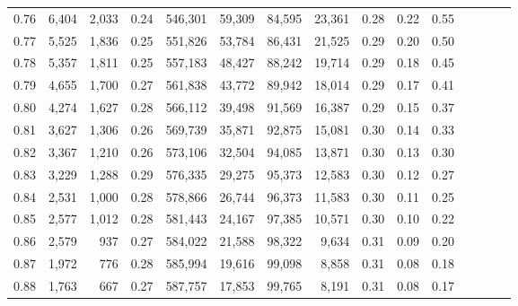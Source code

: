 \begin{tabular}{rrrcrrrrrrrrrrr}
0.76 &   6,404 &  2,033 &                                       0.24 &  546,301 &   59,309 &   84,595 &   23,361 &  0.28 &  0.22 &                         0.55 \\
0.77 &   5,525 &  1,836 &                                       0.25 &  551,826 &   53,784 &   86,431 &   21,525 &  0.29 &  0.20 &                         0.50 \\
0.78 &   5,357 &  1,811 &                                       0.25 &  557,183 &   48,427 &   88,242 &   19,714 &  0.29 &  0.18 &                         0.45 \\
0.79 &   4,655 &  1,700 &                                       0.27 &  561,838 &   43,772 &   89,942 &   18,014 &  0.29 &  0.17 &                         0.41 \\
0.80 &   4,274 &  1,627 &                                       0.28 &  566,112 &   39,498 &   91,569 &   16,387 &  0.29 &  0.15 &                         0.37 \\
0.81 &   3,627 &  1,306 &                                       0.26 &  569,739 &   35,871 &   92,875 &   15,081 &  0.30 &  0.14 &                         0.33 \\
0.82 &   3,367 &  1,210 &                                       0.26 &  573,106 &   32,504 &   94,085 &   13,871 &  0.30 &  0.13 &                         0.30 \\
0.83 &   3,229 &  1,288 &                                       0.29 &  576,335 &   29,275 &   95,373 &   12,583 &  0.30 &  0.12 &                         0.27 \\
0.84 &   2,531 &  1,000 &                                       0.28 &  578,866 &   26,744 &   96,373 &   11,583 &  0.30 &  0.11 &                         0.25 \\
0.85 &   2,577 &  1,012 &                                       0.28 &  581,443 &   24,167 &   97,385 &   10,571 &  0.30 &  0.10 &                         0.22 \\
0.86 &   2,579 &    937 &                                       0.27 &  584,022 &   21,588 &   98,322 &    9,634 &  0.31 &  0.09 &                         0.20 \\
0.87 &   1,972 &    776 &                                       0.28 &  585,994 &   19,616 &   99,098 &    8,858 &  0.31 &  0.08 &                         0.18 \\
0.88 &   1,763 &    667 &                                       0.27 &  587,757 &   17,853 &   99,765 &    8,191 &  0.31 &  0.08 &                         0.17 \\

\end{tabular}
